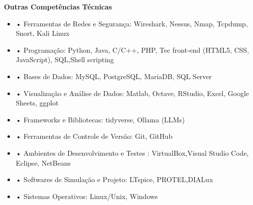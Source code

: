\documentclass[10pt,a4paper,oneside]{article}
\newlength{\datewidth}
\newlength{\textindent}
\begin{document}
	
	\textbf{\hspace{\textindent}Outras Competências Técnicas}	
	\begin{itemize}
		\item[\hspace{\datewidth}] \parbox[t]{\dimexpr\linewidth-\datewidth-\textindent}{•  Ferramentas de Redes e Segurança: Wireshark, Nessus, Nmap, Tcpdump, Snort, Kali Linux}
		\item[\hspace{\datewidth}] \parbox[t]{\dimexpr\linewidth-\datewidth-\textindent}{•  Programação: Python, Java, C/C++, PHP, Tec front-end (HTML5, CSS, JavaScript), SQL,Shell scripting}
		\item[\hspace{\datewidth}] \parbox[t]{\dimexpr\linewidth-\datewidth-\textindent}{•  Bases de Dados: MySQL, PostgreSQL, MariaDB, SQL Server}
		\item[\hspace{\datewidth}] \parbox[t]{\dimexpr\linewidth-\datewidth-\textindent}{•  Visualização e Análise de Dados: Matlab, Octave, RStudio, Excel, Google Sheets, ggplot}
		
		\item[\hspace{\datewidth}] \parbox[t]{\dimexpr\linewidth-\datewidth-\textindent}{•  Frameworks e Bibliotecas: tidyverse, Ollama (LLMs)}	
		
		\item[\hspace{\datewidth}] \parbox[t]{\dimexpr\linewidth-\datewidth-\textindent}{•  Ferramentas de Controle de Versão: Git, GitHub}
		\item[\hspace{\datewidth}] \parbox[t]{\dimexpr\linewidth-\datewidth-\textindent}{•  Ambientes de Desenvolvimento e Testes : VirtualBox,Visual Studio Code, Eclipse, NetBeans}
		\item[\hspace{\datewidth}] \parbox[t]{\dimexpr\linewidth-\datewidth-\textindent}{•  Softwares de Simulação e Projeto: LTspice, PROTEL,DIALux}
		\item[\hspace{\datewidth}] \parbox[t]{\dimexpr\linewidth-\datewidth-\textindent}{•  Sistemas Operativos: Linux/Unix, Windows}
	\end{itemize}
	
\end{document}
